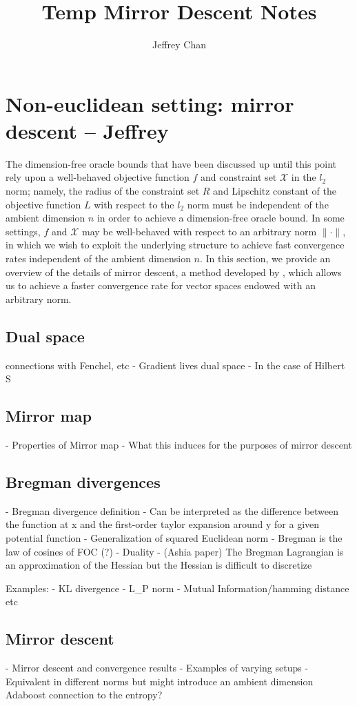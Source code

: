 \documentclass{article}
\title{Temp Mirror Descent Notes}
\author{Jeffrey Chan}
\begin{document}
\maketitle

\section{Non-euclidean setting: mirror descent -- Jeffrey}
The dimension-free oracle bounds that have been discussed up until this point rely upon a well-behaved objective function $f$ and constraint set $\mathcal{X}$ in the $l_2$ norm; namely, the radius of the constraint set $R$ and Lipschitz constant of the objective function $L$ with respect to the $l_2$ norm must be independent of the ambient dimension $n$ in order to achieve a dimension-free oracle bound. In some settings, $f$ and $\mathcal{X}$ may be well-behaved with respect to an arbitrary norm $\|\cdot \|$, in which we wish to exploit the underlying structure to achieve fast convergence rates independent of the ambient dimension $n$. In this section, we provide an overview of the details of mirror descent, a method developed by \cite{blair1985problem}, which allows us to achieve a faster convergence rate for vector spaces endowed with an arbitrary norm. 


\subsection{Dual space}
connections with Fenchel, etc
- Gradient lives dual space
- In the case of Hilbert S

\subsection{Mirror map}
- Properties of Mirror map
- What this induces for the purposes of mirror descent

\subsection{Bregman divergences}
 - Bregman divergence definition
 - Can be interpreted as the difference between the function at x and the first-order taylor expansion around y for a given potential function
 - Generalization of squared Euclidean norm
 - Bregman is the law of cosines of FOC (?)
 - Duality
 - (Ashia paper) The Bregman Lagrangian is an approximation of the Hessian but the Hessian is difficult to discretize

Examples:
- KL divergence
- L_P norm
- Mutual Information/hamming distance etc

\subsection{Mirror descent}
- Mirror descent and convergence results
- Examples of varying setups
- Equivalent in different norms but might introduce an ambient dimension
Adaboost connection to the entropy?



\end{document}
